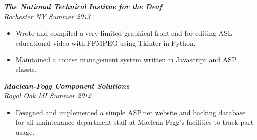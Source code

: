 \documentclass[line,11pt]{res}
\begin{document}
\begin{resume}
\begin{multicols}{2}
\textit{\textbf{The National Technical Institue for the Deaf}\\ Rochester NY \hfill{Summer 2013}}
\begin{itemize}
    \item Wrote and compiled a very limited graphical front end for editing ASL educational video with FFMPEG using Tkinter in Python.
    \item Maintained a course management system written in Javascript and ASP classic.
\end{itemize}

\textit{\textbf{Maclean-Fogg Component Solutions}\\ Royal Oak MI \hfill{Summer 2012}}
\begin{itemize}
    \item Designed and implemented a simple ASP.net website and backing database for all maintenance 
          department staff at Maclean-Fogg's facilities to track part usage.
\end{itemize}
\end{multicols}
\end{resume}
\end{document}
